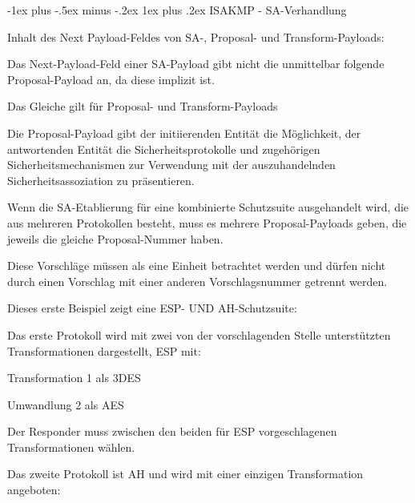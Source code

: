 \documentclass[a4paper]{article}
\makeatletter
\renewcommand{\subsubsection}{\@startsection{subsubsection}{3}{0mm}%
 {-1ex plus -.5ex minus -.2ex}%
 {1ex plus .2ex}%
 {\normalfont\small\bfseries}}
\makeatother
\begin{document}
\begin{multicols}{3}
      \subsubsection{ISAKMP - SA-Verhandlung}
      \begin{itemize*}
            \item Inhalt des Next Payload-Feldes von SA-, Proposal- und Transform-Payloads:
            \begin{itemize*}
                  \item Das Next-Payload-Feld einer SA-Payload gibt nicht die unmittelbar folgende Proposal-Payload an, da diese implizit ist.
                  \item Das Gleiche gilt für Proposal- und Transform-Payloads
            \end{itemize*}
            \item Die Proposal-Payload gibt der initiierenden Entität die Möglichkeit, der antwortenden Entität die Sicherheitsprotokolle und zugehörigen Sicherheitsmechanismen zur Verwendung mit der auszuhandelnden Sicherheitsassoziation zu präsentieren.
            \item Wenn die SA-Etablierung für eine kombinierte Schutzsuite ausgehandelt wird, die aus mehreren Protokollen besteht, muss es mehrere Proposal-Payloads geben, die jeweils die gleiche Proposal-Nummer haben.
            \item Diese Vorschläge müssen als eine Einheit betrachtet werden und dürfen nicht durch einen Vorschlag mit einer anderen Vorschlagsnummer getrennt werden.
            \item Dieses erste Beispiel zeigt eine ESP- UND AH-Schutzsuite:
            \begin{itemize*}
                  \item Das erste Protokoll wird mit zwei von der vorschlagenden Stelle unterstützten Transformationen dargestellt, ESP mit:
                  \begin{itemize*}
                        \item Transformation 1 als 3DES
                        \item Umwandlung 2 als AES
                        \item Der Responder muss zwischen den beiden für ESP vorgeschlagenen Transformationen wählen.
                  \end{itemize*}
                  \item Das zweite Protokoll ist AH und wird mit einer einzigen Transformation angeboten:

\end{itemize*}
\end{itemize*}
\end{multicols}
\end{document}
